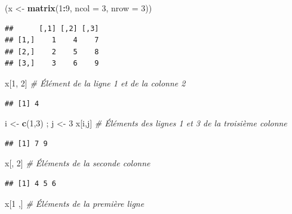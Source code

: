 \documentclass[
  11pt,
]{book}
\newenvironment{Shaded}{\begin{snugshade}}{\end{snugshade}}
\newcommand{\CommentTok}[1]{\textcolor[rgb]{0.56,0.35,0.01}{\textit{#1}}}
\newcommand{\DataTypeTok}[1]{\textcolor[rgb]{0.13,0.29,0.53}{#1}}
\newcommand{\DecValTok}[1]{\textcolor[rgb]{0.00,0.00,0.81}{#1}}
\newcommand{\KeywordTok}[1]{\textcolor[rgb]{0.13,0.29,0.53}{\textbf{#1}}}
\newcommand{\NormalTok}[1]{#1}
\newcommand{\OperatorTok}[1]{\textcolor[rgb]{0.81,0.36,0.00}{\textbf{#1}}}
\newcommand{\StringTok}[1]{\textcolor[rgb]{0.31,0.60,0.02}{#1}}
\numberwithin{equation}{section}
\numberwithin{countremarque}{section}
\begin{document}
\begin{Shaded}
\begin{Highlighting}[]
\NormalTok{(x \textless{}{-}}\StringTok{ }\KeywordTok{matrix}\NormalTok{(}\DecValTok{1}\OperatorTok{:}\DecValTok{9}\NormalTok{, }\DataTypeTok{ncol =} \DecValTok{3}\NormalTok{, }\DataTypeTok{nrow =} \DecValTok{3}\NormalTok{))}
\end{Highlighting}
\end{Shaded}

\begin{lstlisting}
##      [,1] [,2] [,3]
## [1,]    1    4    7
## [2,]    2    5    8
## [3,]    3    6    9
\end{lstlisting}

\begin{Shaded}
\begin{Highlighting}[]
\NormalTok{x[}\DecValTok{1}\NormalTok{, }\DecValTok{2}\NormalTok{]  }\CommentTok{\# Élément de la ligne 1 et de la colonne 2}
\end{Highlighting}
\end{Shaded}

\begin{lstlisting}
## [1] 4
\end{lstlisting}

\begin{Shaded}
\begin{Highlighting}[]
\NormalTok{i \textless{}{-}}\StringTok{ }\KeywordTok{c}\NormalTok{(}\DecValTok{1}\NormalTok{,}\DecValTok{3}\NormalTok{) ; j \textless{}{-}}\StringTok{ }\DecValTok{3}
\NormalTok{x[i,j]  }\CommentTok{\# Éléments des lignes 1 et 3 de la troisième colonne}
\end{Highlighting}
\end{Shaded}

\begin{lstlisting}
## [1] 7 9
\end{lstlisting}

\begin{Shaded}
\begin{Highlighting}[]
\NormalTok{x[, }\DecValTok{2}\NormalTok{]  }\CommentTok{\# Éléments de la seconde colonne}
\end{Highlighting}
\end{Shaded}

\begin{lstlisting}
## [1] 4 5 6
\end{lstlisting}

\begin{Shaded}
\begin{Highlighting}[]
\NormalTok{x[}\DecValTok{1}\NormalTok{ ,]  }\CommentTok{\# Éléments de la première ligne}
\end{Highlighting}
\end{Shaded}
\end{document}
